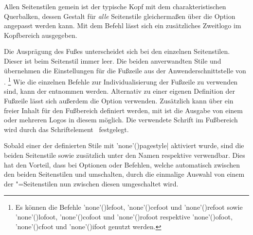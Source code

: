 \begin{DeclareEntity*}{}
\begin{DeclareEntity*}{}
\begin{DeclareEntity*}{}
\begin{Declaration}
\begin{Declaration}
\begin{Declaration}
Allen Seitenstilen gemein ist der typische Kopf mit dem charakteristischen 
Querbalken, dessen Gestalt für \emph{alle} Seitenstile gleichermaßen über die 
Option  angepasst werden kann. Mit dem Befehl  
lässt sich ein zusätzliches Zweitlogo im Kopfbereich ausgegeben.

Die Ausprägung des Fußes unterscheidet sich bei den einzelnen Seitenstilen. 
Dieser ist beim Seitenstil  immer leer. Die beiden 
anverwandten Stile  und  
übernehmen die Einstellungen für die Fußzeile aus der Anwenderschnittstelle 
von .%
\footnote{%
  Es können die Befehle
  \Macro'none'(){lefoot}, 
  \Macro'none'(){cefoot} und 
  \Macro'none'(){refoot} sowie 
  \Macro'none'(){lofoot}, 
  \Macro'none'(){cofoot} und 
  \Macro'none'(){rofoot} respektive 
  \Macro'none'(){ofoot}, 
  \Macro'none'(){cfoot} und 
  \Macro'none'(){ifoot}
  genutzt werden.%
}
Wie die einzelnen Befehle zur Individualisierung der Fußzeile zu verwenden 
sind, kann der  entnommen werden. Alternativ 
zu einer eigenen Definition der Fußzeile lässt sich außerdem die Option 
 verwenden. Zusätzlich kann über  ein freier 
Inhalt für den Fußbereich definiert werden, mit  ist die 
Ausgabe von einem oder mehreren Logos in diesem möglich. Die verwendete Schrift 
im Fußbereich wird durch das Schriftelement~ festgelegt.

Sobald einer der definierten Stile mit 
\Macro'none'(){pagestyle|} aktiviert 
wurde, sind die beiden Seitenstile  sowie 
 zusätzlich unter den Namen  
respektive  verwendbar. Dies hat den Vorteil, dass bei 
Optionen oder Befehlen, welche automatisch zwischen den beiden Seitenstilen 
 und  umschalten, durch die einmalige 
Auswahl von einem der "=Seitenstilen nun zwischen diesen 
umgeschaltet wird.


\end{Declaration}
\end{Declaration}
\end{Declaration}
\end{DeclareEntity*}
\end{DeclareEntity*}
\end{DeclareEntity*}
